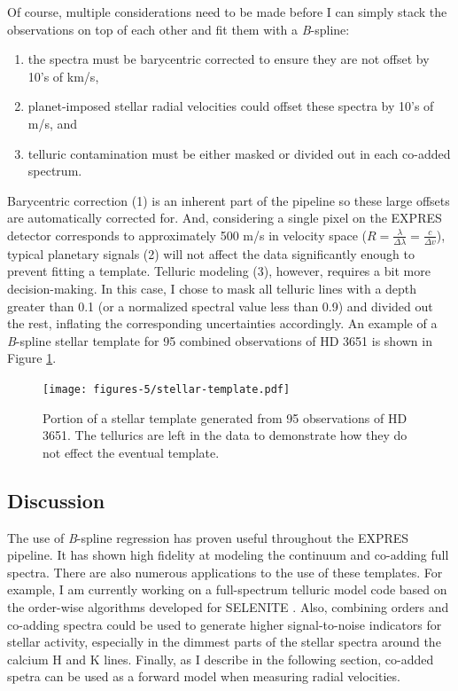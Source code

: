 Of course, multiple considerations need to be made before I can simply stack the observations on top of each other and fit them with a \textit{B}-spline:
\begin{enumerate}
    \item the spectra must be barycentric corrected to ensure they are not offset by 10's of km/s,
    \item planet-imposed stellar radial velocities could offset these spectra by 10's of m/s, and
    \item telluric contamination must be either masked or divided out in each co-added spectrum.
\end{enumerate}
Barycentric correction (1) is an inherent part of the pipeline so these large offsets are automatically corrected for. And, considering a single pixel on the EXPRES detector corresponds to approximately 500 m/s in velocity space ($R = \frac{\lambda}{\Delta\lambda} = \frac{c}{\Delta v}$), typical planetary signals (2) will not affect the data significantly enough to prevent fitting a template. Telluric modeling (3), however, requires a bit more decision-making. In this case, I chose to mask all telluric lines with a depth greater than 0.1 (or a normalized spectral value less than 0.9) and divided out the rest, inflating the corresponding uncertainties accordingly. An example of a \textit{B}-spline stellar template for 95 combined observations of HD 3651 is shown in Figure \ref{fig:stellar-template}. 

\begin{figure}
    \centering
    \texttt{[image: figures-5/stellar-template.pdf]}
    \caption{Portion of a stellar template generated from 95 observations of HD 3651. The tellurics are left in the data to demonstrate how they do not effect the eventual template.}
    \label{fig:stellar-template}
\end{figure}

\subsection{Discussion}

The use of \textit{B}-spline regression has proven useful throughout the EXPRES pipeline. It has shown high fidelity at modeling the continuum and co-adding full spectra. There are also numerous applications to the use of these templates. For example, I am currently working on a full-spectrum telluric model code based on the order-wise algorithms developed for SELENITE \citep{leet_toward_2019}. Also, combining orders and co-adding spectra could be used to generate higher signal-to-noise indicators for stellar activity, especially in the dimmest parts of the stellar spectra around the calcium H and K lines. Finally, as I describe in the following section, co-added spetra can be used as a forward model when measuring radial velocities.

